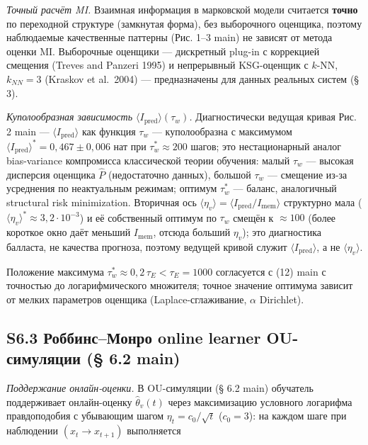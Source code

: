 \documentclass[pdflatex,sn-mathphys-ay]{sn-jnl}
\begin{document}
\emph{Точный расчёт MI.} Взаимная информация в марковской модели считается \textbf{точно} по переходной структуре (замкнутая форма), без выборочного оценщика, поэтому наблюдаемые качественные паттерны (Рис. 1--3 main) не зависят от метода оценки MI. Выборочные оценщики --- дискретный plug-in с коррекцией смещения (Treves and Panzeri 1995) и непрерывный KSG-оценщик с \(k\)-NN, \(k_{NN} = 3\) (Kraskov et al.~2004) --- предназначены для данных реальных систем (§ 3).



\emph{Куполообразная зависимость \(\langle I_{\text{pred}}\rangle(\tau_w)\).} Диагностически ведущая кривая Рис. 2 main --- \(\langle I_{\text{pred}}\rangle\) как функция \(\tau_w\) --- куполообразна с максимумом \(\langle I_{\text{pred}}\rangle^* = 0{,}467 \pm 0{,}006\) нат при \(\tau_w^* \approx 200\) шагов; это нестационарный аналог bias-variance компромисса классической теории обучения: малый \(\tau_w\) --- высокая дисперсия оценщика \(\hat P\) (недостаточно данных), большой \(\tau_w\) --- смещение из-за усреднения по неактуальным режимам; оптимум \(\tau_w^*\) --- баланс, аналогичный structural risk minimization. Вторичная ось \(\langle\eta_v\rangle = \langle I_{\text{pred}}/I_{\text{mem}}\rangle\) структурно мала (\(\langle\eta_v\rangle^* \approx 3{,}2 \cdot 10^{-3}\)) и её собственный оптимум по \(\tau_w\) смещён к \(\approx 100\) (более короткое окно даёт меньший \(I_{\text{mem}}\), отсюда больший \(\eta_v\)); это диагностика балласта, не качества прогноза, поэтому ведущей кривой служит \(\langle I_{\text{pred}}\rangle\), а не \(\langle\eta_v\rangle\).



Положение максимума \(\tau_w^* \approx 0{,}2\,\tau_E < \tau_E = 1000\) согласуется с (12) main с точностью до логарифмического множителя; точное значение оптимума зависит от мелких параметров оценщика (Laplace-сглаживание, \(\alpha\) Dirichlet).



\subsection*{S6.3 Роббинс--Монро online learner OU-симуляции (§ 6.2 main)}\label{s6.3-ux440ux43eux431ux431ux438ux43dux441ux43cux43eux43dux440ux43e-online-learner-ou-ux441ux438ux43cux443ux43bux44fux446ux438ux438-6.2-main}



\emph{Поддержание онлайн-оценки.} В OU-симуляции (§ 6.2 main) обучатель поддерживает онлайн-оценку \(\hat\theta_v(t)\) через максимизацию условного логарифма правдоподобия с убывающим шагом \(\eta_t = c_0/\sqrt{t}\) (\(c_0 = 3\)): на каждом шаге при наблюдении \((x_t \to x_{t+1})\) выполняется
\end{document}
